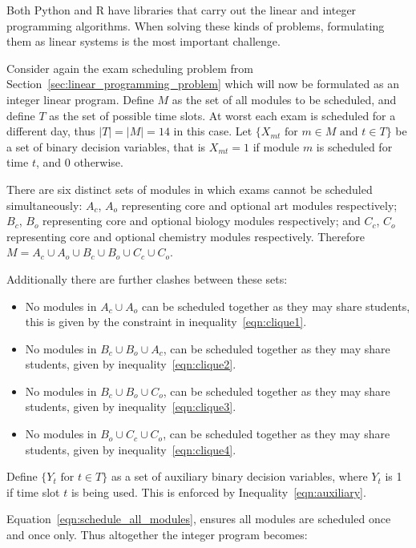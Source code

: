 Both Python and R have libraries that carry out the linear and integer
programming algorithms. When solving these kinds of problems, formulating
them as linear systems is the most important challenge.

Consider again the exam scheduling problem from
Section~\ref{sec:linear_programming_problem} which
will now be formulated as an integer linear program.
Define \(M\) as the set of all modules to be scheduled, and define \(T\) as the set
of possible time slots. At worst each exam is
scheduled for a different day, thus \(|T| = |M| = 14\) in this case.
Let \(\{X_{mt} \text{ for } m \in M \text{ and } t \in T\}\) be a set of binary
decision variables, that is \(X_{mt} = 1\) if module \(m\) is scheduled for time
\(t\), and \(0\) otherwise.

There are six distinct sets of modules in which exams cannot be scheduled
simultaneously: \(A_c\), \(A_o\) representing core and optional art modules
respectively; \(B_c\), \(B_o\) representing core and optional biology modules
respectively; and \(C_c\), \(C_o\) representing core and optional chemistry modules
respectively.
Therefore \(M = A_c \cup A_o \cup B_c \cup B_o \cup C_c \cup C_o\).

Additionally there are further clashes between these sets:
\begin{itemize}
  \item No modules in \(A_c \cup A_o\) can be scheduled together as they may
  share students, this is given by the constraint in inequality~\ref{eqn:clique1}.
  \item No modules in \(B_c \cup B_o \cup A_c\), can be scheduled together as
  they may share students, given by inequality~\ref{eqn:clique2}.
  \item No modules in \(B_c \cup B_o \cup C_o\), can be scheduled together as
  they may share students, given by inequality~\ref{eqn:clique3}.
  \item No modules in \(B_o \cup C_c \cup C_o\), can be scheduled together as
  they may share students, given by inequality~\ref{eqn:clique4}.
\end{itemize}

Define \(\{Y_t \text{ for } t \in T\}\) as a set of auxiliary binary
decision variables, where \(Y_t\) is 1 if time slot \(t\) is being used. This is
enforced by Inequality~\ref{eqn:auxiliary}.

Equation~\ref{eqn:schedule_all_modules},
ensures all modules are scheduled once and once only.
Thus altogether the integer program becomes:

